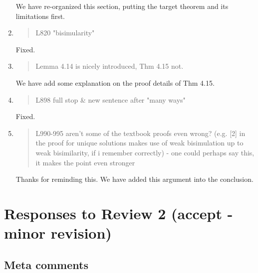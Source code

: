 \begin{enumerate}
  We have re-organized this section, putting the target theorem and
  its limitations  first.
  
\item \begin{quote}
    L820 "bisimularity"
  \end{quote}
  Fixed.
  
\item \begin{quote}
    Lemma 4.14 is nicely introduced, Thm 4.15 not. 
  \end{quote}

  We have add some explanation on the proof details of Thm 4.15.
  
\item \begin{quote}
    L898 full stop \& new sentence after "many ways"
  \end{quote}
  Fixed.
  
\item \begin{quote}
    L990-995 aren't some of the textbook proofs even wrong? (e.g. [2]
    in the proof for unique solutions makes use of weak bisimulation
    up to weak bisimilarity, if i remember correctly) - one could
    perhaps say this, it makes the point even stronger
  \end{quote}

  Thanks for reminding this. We have added this argument into the conclusion.
  
\end{enumerate}

\section*{Responses to Review 2 (accept - minor revision)}

\subsection*{Meta comments}

